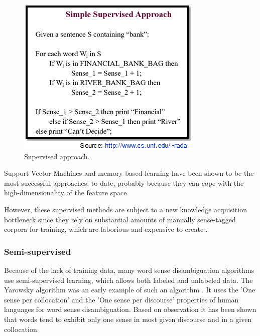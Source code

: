 \begin{figure}[tbh]
	\begin{center}
		\includegraphics[width=\columnwidth]{Union_Background_Chart_sup3}
	\end{center}
	\caption{Supervised approach.}
\end{figure}

Support Vector Machines and memory-based learning have been shown to be the most successful approaches, to date, probably because they can cope with the high-dimensionality of the feature space. 

However, these supervised methods are subject to a new knowledge acquisition bottleneck since they rely on substantial amounts of manually sense-tagged corpora for training, which are laborious and expensive to create \cite{aramossoto2016onthe}.

\subsubsection*{Semi-supervised}

Because of the lack of training data, many word sense disambiguation algorithms use semi-supervised learning, which allows both labeled and unlabeled data. 
The Yarowsky algorithm was an early example of such an algorithm \cite{Gartner201317}. 
It uses the 'One sense per collocation' and the 'One sense per discourse' properties of human languages for word sense disambiguation. 
Based on observation it has been shown that words tend to exhibit only one sense in most given discourse and in a given collocation. \cite{5599823}


